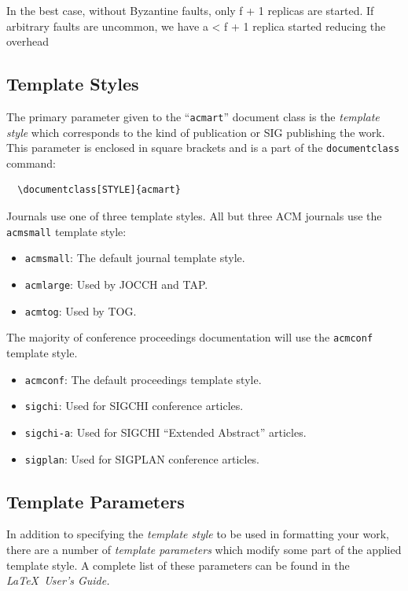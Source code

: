 \documentclass[sigchi]{acmart}
\begin{document}
In the best case, without Byzantine faults, only f + 1 replicas are started. If arbitrary faults are uncommon, we have a < f + 1 replica started reducing the overhead 












\subsection{Template Styles}

The primary parameter given to the ``\verb|acmart|'' document class is
the {\itshape template style} which corresponds to the kind of publication
or SIG publishing the work. This parameter is enclosed in square
brackets and is a part of the {\verb|documentclass|} command:
\begin{verbatim}
  \documentclass[STYLE]{acmart}
\end{verbatim}

Journals use one of three template styles. All but three ACM journals
use the {\verb|acmsmall|} template style:
\begin{itemize}
\item {\verb|acmsmall|}: The default journal template style.
\item {\verb|acmlarge|}: Used by JOCCH and TAP.
\item {\verb|acmtog|}: Used by TOG.
\end{itemize}

The majority of conference proceedings documentation will use the {\verb|acmconf|} template style.
\begin{itemize}
\item {\verb|acmconf|}: The default proceedings template style.
\item{\verb|sigchi|}: Used for SIGCHI conference articles.
\item{\verb|sigchi-a|}: Used for SIGCHI ``Extended Abstract'' articles.
\item{\verb|sigplan|}: Used for SIGPLAN conference articles.
\end{itemize}

\subsection{Template Parameters}

In addition to specifying the {\itshape template style} to be used in
formatting your work, there are a number of {\itshape template parameters}
which modify some part of the applied template style. A complete list
of these parameters can be found in the {\itshape \LaTeX\ User's Guide.}
\end{document}
